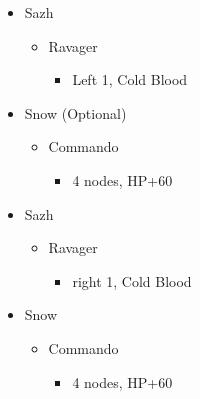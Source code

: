 \begin{paracol}{2}
\begin{menu}
	\begin{itemize}
		\crystarium
		\begin{itemize}
			\item Sazh
			      \begin{itemize}
				      \item Ravager
				            \begin{itemize}
					            \item Left 1, Cold Blood
				            \end{itemize}
			      \end{itemize}
			\item Snow (Optional)
			      \begin{itemize}
				      \item Commando
				            \begin{itemize}
					            \item 4 nodes, HP+60
				            \end{itemize}
			      \end{itemize}
		\end{itemize}
	\end{itemize}
\end{menu}
\switchcolumn
\begin{menu}
	\begin{itemize}
		\crystarium
		\begin{itemize}
			\item Sazh
			      \begin{itemize}
				      \item Ravager
				            \begin{itemize}
					            \item right 1, Cold Blood
				            \end{itemize}
			      \end{itemize}
			\item Snow
			      \begin{itemize}
				      \item Commando
				            \begin{itemize}
					            \item 4 nodes, HP+60
				            \end{itemize}
			      \end{itemize}
		\end{itemize}
	\end{itemize}
\end{menu}
\switchcolumn*

\end{paracol}
